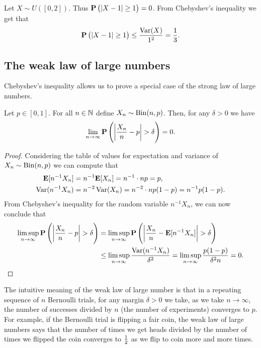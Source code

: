 \documentclass[11pt,a4paper]{article}
\begin{document}
\begin{example}
  Let $X \sim U([0,2])$. Thus $\mathbf{P}\left(|X - 1| \geq 1\right) = 0$.
  From Chebyshev's inequality we get that
  \[
    \mathbf{P}\left(|X - 1| \geq 1\right) \le
    \frac{\operatorname{Var}(X)}{1^2} =
    \frac{1}{3}.
  \]
\end{example}

\subsection{The weak law of large numbers}
Chebyshev's inequality allows us to prove a special
case of the strong law of large numbers.

\begin{theorem}
  Let $p \in [0,1]$. For all $n \in \mathbb{N}$ define $X_n \sim \operatorname{Bin}(n,p)$.
  Then, for any $\delta > 0$ we have
  \[
    \lim_{n \to \infty}
    \mathbf{P}\left(\left|\frac{X_n}{n} - p\right| > \delta\right) =
    0.
  \]
\end{theorem}
\begin{proof}
  Considering the table of values for expectation and variance
  of $X_n \sim \operatorname{Bin}(n,p)$ we can compute that
  \begin{align*}
    \mathbf{E}[n^{-1} X_n] &=
    n^{-1} \mathbf{E}[X_n] =
    n^{-1} \cdot np = p, \\
    \operatorname{Var}(n^{-1} X_n) &=
    n^{-2} \operatorname{Var}(X_n) =
    n^{-2} \cdot np(1 - p) =
    n^{-1} p (1 - p).
  \end{align*}
  From Chebyshev's inequality for the random variable $n^{-1} X_n$,
  we can now conclude that
  \begin{align*}
    \limsup_{n \to \infty}
      \mathbf{P}\left(\left|\frac{X_n}{n} - p\right| > \delta\right) &=
    \limsup_{n \to \infty}
      \mathbf{P}\left(\left|\frac{X_n}{n} - \mathbf{E}[n^{-1} X_n] \right| > \delta\right) 
                                                             \\ &\le
    \limsup_{n \to \infty} \frac{\operatorname{Var}(n^{-1} X_n)}{\delta^2} =
    \limsup_{n \to \infty} \frac{p (1 - p)}{\delta^2 n} = 0.
  \end{align*}
\end{proof}

\begin{remark}
  The intuitive meaning of the weak law of large number
  is that in a repeating sequence of $n$ Bernoulli trials,
  for any margin $\delta > 0$ we take,
  as we take $n \to \infty$,
  the number of successes divided by $n$
  (the number of experiments) converges to $p$.
  For example, if the Bernoulli trial is flipping a fair coin,
  the weak law of large numbers says that the number of times
  we get heads divided by the number of times we flipped the coin
  converges to $\frac{1}{2}$ as we flip to coin more and more times.
\end{remark}
\end{document}
